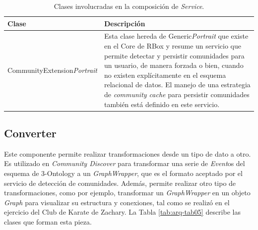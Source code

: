 \begin{table}[H]
  \begin{center}
    \caption{Clases involucradas en la composición de \textit{Service}.}
    \label{tab:arq-tab04}
      \begin{tabular}{|L{4cm}|L{10cm}|}
        \hline
        \textbf{Clase} & \textbf{Descripción}\\ \hline
         CommunityExtension\textit{Portrait} & Esta clase hereda de Generic\textit{Portrait} que existe en el Core de RBox y resume un servicio que permite detectar y persistir comunidades para un usuario, de manera forzada o bien, cuando no existen explícitamente en el esquema relacional de datos. El manejo de una estrategia de \textit{community cache} para persistir comunidades también está definido en este servicio.\\ \hline
      \end{tabular}
  \end{center}
\end{table}

\subsection{Converter}

Este componente permite realizar transformaciones desde un tipo de dato a otro. Es utilizado en \textit{Community Discover} para transformar una serie de \textit{Event}os del esquema de 3-Ontology a un \textit{\textit{Graph}Wrapper}, que es el formato aceptado por el servicio de detección de comunidades. Además, permite realizar otro tipo de transformaciones, como por ejemplo, transformar un \textit{\textit{Graph}Wrapper} en un objeto \textit{Graph} para visualizar su estructura y conexiones, tal como se realizó en el ejercicio del Club de Karate de Zachary. La Tabla \ref{tab:arq-tab05} describe las clases que forman esta pieza.

